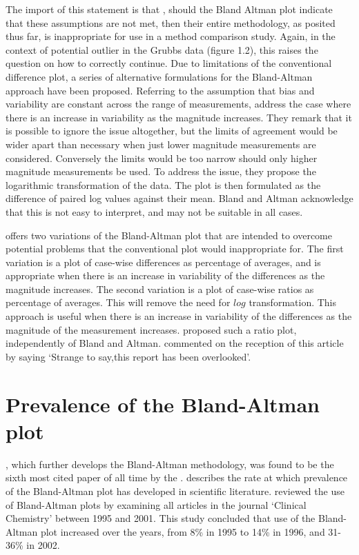 \documentclass[12pt, a4paper]{report}
\theoremstyle{plain}
\theoremstyle{definition}
\theoremstyle{remark}
\begin{document}
The import of this statement is that , should the Bland Altman
plot indicate that these assumptions are not met, then their
entire methodology, as posited thus far, is inappropriate for use
in a method comparison study. Again, in the context of potential
outlier in the Grubbs data (figure 1.2), this raises the question
on how to correctly continue. Due to limitations of the conventional difference plot, a series of alternative formulations for the Bland-Altman approach have been proposed.
Referring to the assumption that bias and variability are constant across the range
of measurements, \citet{BA99} address the case where there is an increase in variability as the magnitude increases. They remark 	that it is possible to ignore the issue altogether, but the limits of agreement would be wider apart than necessary when just lower magnitude measurements are considered. Conversely the limits would be too narrow should only higher magnitude measurements be used.	To address the issue, they propose the logarithmic transformation of the data. The plot is then formulated as the difference of paired log values against their mean. Bland and Altman acknowledge that this is not easy to interpret, and may not be suitable in all cases.
	
\citet{BA99} offers two variations of the Bland-Altman plot that are intended to overcome potential problems that the conventional
plot would inappropriate for. The first variation is a plot of case-wise differences as percentage of averages, and is
appropriate when there is an increase in variability of the differences as the magnitude increases. The second variation is a
plot of case-wise ratios as percentage of averages. This will remove the need for $log$ transformation. This approach is useful
when there is an increase in variability of the differences as the magnitude of the measurement increases. \citet{Eksborg} proposed
such a ratio plot, independently of Bland and Altman. \citet{Dewitte} commented on the reception of this article by saying `Strange to say,this report has been overlooked'.
	
\section{Prevalence of the Bland-Altman plot}
	
	\citet*{BA86}, which further develops the Bland-Altman methodology,
	was found to be the sixth most cited paper of all time by the
	\citet{BAcite}. \cite{Dewitte} describes the rate at which
	prevalence of the Bland-Altman plot has developed in scientific
	literature. \citet{Dewitte} reviewed the use of Bland-Altman plots
	by examining all articles in the journal `Clinical Chemistry'
	between 1995 and 2001. This study concluded that use of the
	Bland-Altman plot increased over the years, from 8\% in 1995 to
	14\% in 1996, and 31-36\% in 2002.
	
\end{document}
